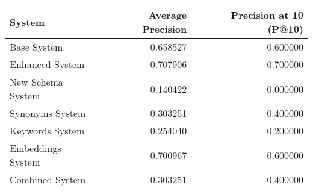 \begin{tabular}{lrr}
\toprule
System & Average Precision & Precision at 10 (P@10) \\
\midrule
Base System & 0.658527 & 0.600000 \\
Enhanced System & 0.707906 & 0.700000 \\
New Schema System & 0.140422 & 0.000000 \\
Synonyms System & 0.303251 & 0.400000 \\
Keywords System & 0.254040 & 0.200000 \\
Embeddings System & 0.700967 & 0.600000 \\
Combined System & 0.303251 & 0.400000 \\
\bottomrule
\end{tabular}
